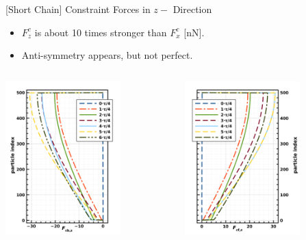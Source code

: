\documentclass[t,presentation]{beamer}
\begin{document}
\begin{frame}[label={sec:orgccef4ab}]{[Short Chain] Constraint  Forces in \(z-\) Direction}
\begin{itemize}
\item \(F_z^c\) is about 10 times stronger than \(F_x^c\) [nN].
\item Anti-symmetry appears, but not perfect.
\end{itemize}
\begin{columns}[c]
\begin{column}{.45\textwidth}
\centering
\includegraphics[width=1.75in]{figures/cZpvdf500FC1.png}\par
\end{column}
\begin{column}{.45\textwidth} %
\centering
\includegraphics[width=1.75in]{figures/cZpvdf500FC2.png}\par
\end{column}
\end{columns}
\end{frame}
\end{document}
